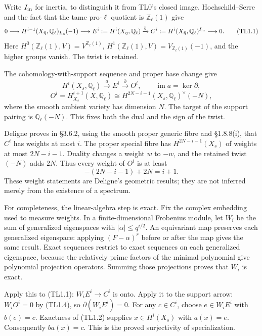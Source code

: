 Write \(I_{\rm in}\) for inertia, to distinguish it from TL0's closed
image. Hochschild--Serre and the fact that the tame pro-\(\ell\)
quotient is \(\mathbb Z_\ell(1)\) give \[
0\longrightarrow
H^{i-1}(X_{\bar\eta},\mathbb Q_\ell)_{I_{\rm in}}(-1)
\longrightarrow E^i:=H^i(X_\eta,\mathbb Q_\ell)
\xrightarrow{b}
C^i:=H^i(X_{\bar\eta},\mathbb Q_\ell)^{I_{\rm in}}
\longrightarrow0.
\tag{TL1.1}
\] Here \(H^0(\mathbb Z_\ell(1),V)=V^{\mathbb Z_\ell(1)}\),
\(H^1(\mathbb Z_\ell(1),V)=V_{\mathbb Z_\ell(1)}(-1)\), and the higher
groups vanish. The twist is retained.

The cohomology-with-support sequence and proper base change give \[
H^i(X_s,\mathbb Q_\ell)\xrightarrow{a}E^i
\xrightarrow{\partial}O^i,\qquad
\operatorname{im}a=\ker\partial,
\tag{TL1.2}
\] \[
O^i=H^{i+1}_{X_s}(X,\mathbb Q_\ell)
\cong H^{2N-i-1}(X_s,\mathbb Q_\ell)^\vee(-N),
\tag{TL1.3}
\] where the smooth ambient variety has dimension \(N\). The target of
the support pairing is \(\mathbb Q_\ell(-N)\). This fixes both the dual
and the sign of the twist.

Deligne proves in §3.6.2, using the smooth proper generic fibre and
§1.8.8(i), that \(C^i\) has weights at most \(i\). The proper special
fibre has \(H^{2N-i-1}(X_s)\) of weights at most \(2N-i-1\). Duality
changes a weight \(w\) to \(-w\), and the retained twist \((-N)\) adds
\(2N\). Thus every weight of \(O^i\) is at least \[
-(2N-i-1)+2N=i+1.
\tag{TL1.4}
\] These weight statements are Deligne's geometric results; they are not
inferred merely from the existence of a spectrum.

For completeness, the linear-algebra step is exact. Fix the complex
embedding used to measure weights. In a finite-dimensional Frobenius
module, let \(W_i\) be the sum of generalized eigenspaces with
\(|\alpha|\le q^{i/2}\). An equivariant map preserves each generalized
eigenspace: applying \((F-\alpha)^r\) before or after the map gives the
same result. Exact sequences restrict to exact sequences on each
generalized eigenspace, because the relatively prime factors of the
minimal polynomial give polynomial projection operators. Summing those
projections proves that \(W_i\) is exact.

Apply this to (TL1.1): \(W_iE^i\to C^i\) is onto. Apply it to the
support arrow: \(W_iO^i=0\) by (TL1.4), so \(\partial(W_iE^i)=0\). For
any \(c\in C^i\), choose \(e\in W_iE^i\) with \(b(e)=c\). Exactness of
(TL1.2) supplies \(x\in H^i(X_s)\) with \(a(x)=e\). Consequently
\(ba(x)=c\). This is the proved surjectivity of specialization.

